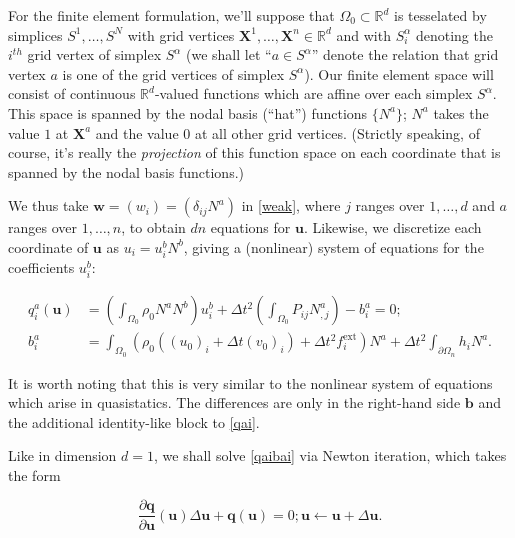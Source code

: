 \documentclass{article}
\begin{document}
For the finite element formulation, we'll suppose that \(\Omega_0 \subset \mathbb{R}^d\) is tesselated by simplices \(S^1, \dotsc, S^N\) with grid vertices \(\mathbf{X}^1, \dotsc, \mathbf{X}^n \in \mathbb{R}^d\) and with \(S^{\alpha}_i\) denoting the \(i^{th}\) grid vertex of simplex \(S^{\alpha}\) (we shall let ``\(a \in S^{\alpha}\)'' denote the relation that grid vertex \(a\) is one of the grid vertices of simplex \(S^{\alpha}\)).  Our finite element space will consist of continuous \(\mathbb{R}^d\)-valued functions which are affine over each simplex \(S^{\alpha}\).  This space is spanned by the nodal basis (``hat'') functions \(\{N^a\}\); \(N^a\) takes the value \(1\) at \(\mathbf{X}^a\) and the value \(0\) at all other grid vertices.  (Strictly speaking, of course, it's really the {\em projection} of this function space on each coordinate that is spanned by the nodal basis functions.)

We thus take \(\mathbf{w} = (w_i) = \left( \delta_{ij} N^a \right)\) in \eqref{weak}, where \(j\) ranges over \(1, \dotsc, d\) and \(a\) ranges over \(1, \dotsc, n\), to obtain \(d n\) equations for \(\mathbf{u}\).  Likewise, we discretize each coordinate of \(\mathbf{u}\) as \(u_i = u_i^b N^b\), giving a (nonlinear) system of equations for the coefficients \(u_i^b\):

\begin{subequations}\label{qaibai}
\begin{align}
q^a_i(\mathbf{u}) & = \left( \int_{\Omega_0} \rho_0 N^a N^b \right) u_i^b + \Delta t^2 \left( \int_{\Omega_0} P_{ij} N^a_{,j} \right) - b^a_i = 0; \label{qai} \\
b^a_i & = \int_{\Omega_0} \left( \rho_0 \left( (u_0)_i + \Delta t (v_0)_i \right) + \Delta t^2 f^{\text{ext}}_i \right) N^a + \Delta t^2 \int_{\partial \Omega_n} h_i N^a.
\end{align}
\end{subequations}

It is worth noting that this is very similar to the nonlinear system of equations which arise in quasistatics.  The differences are only in the right-hand side \(\mathbf{b}\) and the additional identity-like block to \eqref{qai}.

Like in dimension \(d = 1\), we shall solve \eqref{qaibai} via Newton iteration, which takes the form

\begin{subequations}
\begin{equation}
\frac{\partial \mathbf{q}}{\partial \mathbf{u}} \left( \mathbf{u} \right) \Delta \mathbf{u} + \mathbf{q} \left( \mathbf{u} \right) = 0;
\end{equation}
\begin{equation}
\mathbf{u} \leftarrow \mathbf{u} + \Delta \mathbf{u}.
\end{equation}
\end{subequations}
\end{document}
